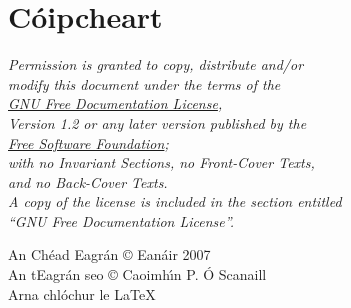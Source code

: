

\newpage
\chapter*{C\'oipcheart} 

\begin{center}
\textit{Permission is granted to copy, distribute and/or \\
modify this document under the terms of the \\
\href{http://www.gnu.org/copyleft/fdl.html}{GNU Free Documentation License}, \\
Version 1.2 or any later version published by the \\
\href{http://www.gnu.org/fsf/fsf.html}{Free Software Foundation}; \\
with no Invariant Sections, no Front-Cover Texts, \\
and no Back-Cover Texts. \\
A copy of the license is included in the section entitled \\
``GNU Free Documentation License''.}
\vspace{7ex}

An Ch\'ead Eagr\'an \copyright \hspace{0.6ex} Ean\'air 2007 \\
\vspace{1ex}
An tEagr\'an seo 
\copyright \hspace{0.6ex} Caoimh\'{\i}n P. \'O Scanaill \the\year \\
\vspace{20ex}
{\small Arna chl\'ochur le \LaTeX}
\end{center}



\newpage
